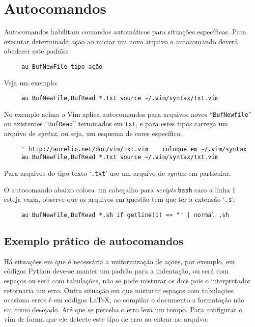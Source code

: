\section{Autocomandos }
\label{Autocomandos }

Autocomandos habilitam comandos automáticos para situações
específicas. Para executar determinada ação ao
iniciar um novo arquivo o autocomando deverá obedecer este padrão:

\begin{verbatim}
     au BufNewFile tipo ação
\end{verbatim}

Veja um exemplo:

\begin{verbatim}
     au BufNewFile,BufRead *.txt source ~/.vim/syntax/txt.vim
\end{verbatim}

No exemplo acima o Vim aplica autocomandos para arquivos novos
``{\tt BufNewfile}'' ou existentes ``{\tt BufRead}'' terminados em \verb|txt|, e para
estes tipos carrega um arquivo de {\em syntax}, ou seja, um esquema de cores
específico.

\begin{verbatim}
     " http://aurelio.net/doc/vim/txt.vim    coloque em ~/.vim/syntax
     au BufNewFile,BufRead *.txt source ~/.vim/syntax/txt.vim
\end{verbatim}

Para arquivos do tipo texto `{\tt *.txt}' use um arquivo de {\em syntax} em
particular.

O autocomando abaixo coloca um cabeçalho para {\em scripts} {\tt bash} caso a
linha 1 esteja vazia, observe que os arquivos em questão tem que ter a
extensão `{\tt .s}'.

\begin{verbatim}
     au BufNewFile,BufRead *.sh if getline(1) == "" | normal ,sh
\end{verbatim}

\subsection{Exemplo prático de autocomandos}
\label{sub:Exemplo prático de autocomandos}

Há situações em que é necessária a uniformização de ações, por exemplo, em
códigos Python deve-se manter um padrão para a indentação, ou será com espaços
ou será com tabulações, não se pode misturar os dois pois o interpretador retornaria um erro.
Outra situação em que misturar espaços com tabulações ocasiona erros é em
códigos \LaTeX, ao compilar o documento a formatação não sai como desejado.
Até que se perceba o erro leva um tempo.  Para configurar o vim de forma que
ele detecte este tipo de erro ao entrar no arquivo:

